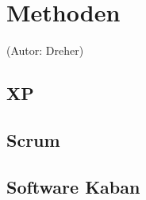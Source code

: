 \section{Methoden}
(Autor: Dreher)

\subsection{XP}

\subsection{Scrum}

\subsection{Software Kaban}

